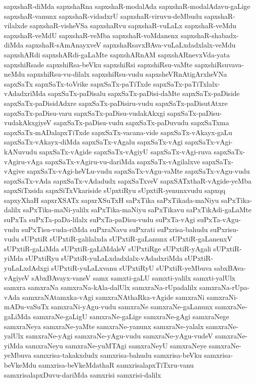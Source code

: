 {sapxshaR-diMda
sapxshaRna
sapxshaR-modalAda
sapxshaR-modalAdavu-gaLige
sapxshaR-vanunx
sapxshaR-vidadxrU
sapxshaR-viruvu-deMbudu
sapxshaR-vilalxde
sapxshaR-visheVSa
sapxshaRvu
sapxshaR-vuLaLx
sapxshaR-veMdu
sapxshaR-veMdU
sapxshaR-veMba
sapxshaR-voMdanenx
sapxshaR-shabadx-diMda
sapxshaR-sAmAnayxveV
sapxshaRsavxBAva-vuLaLxdadxlalx-veMdu
sapxshARdi
sapxshARdi-gaLaMte
sapxshARnAM
sapxshARnevxVda-yata
sapxshiRsade
sapxshiRsa-beVku
sapxshiRsi
sapxshiRsu-vaMte
sapxshiRsuvava-neMdu
sapxshiRsu-vu-dilalx
sapxshiRsu-vudu
sapxsheVRnAtigArxheVNa
sapxSaTx
sapxSaTx-toVrike
sapxSaTx-paTiTxde
sapxSaTx-paTiTxlalx-vAdadxriMda
sapxSaTx-paDisalu
sapxSaTx-paDisi-daMte
sapxSaTx-paDiside
sapxSaTx-paDisidAdxre
sapxSaTx-paDisiru-vudu
sapxSaTx-paDisutAtxre
sapxSaTx-paDisu-varu
sapxSaTx-paDisu-vudakAkxgi
sapxSaTx-paDisu-vudakAkxgiyeV
sapxSaTx-paDisu-vudu
sapxSaTx-paDuvudu
sapxSaTxma
sapxSaTx-mADalapxTiTxde
sapxSaTx-vacana-vide
sapxSaTx-vAkayx-gaLu
sapxSaTx-vAkayx-diMda
sapxSaTx-vAgalu
sapxSaTx-vAgi
sapxSaTx-vAgi-kANuvudu
sapxSaTx-vAgide
sapxSaTx-vAgiyU
sapxSaTx-vAgi-ruva
sapxSaTx-vAgiru-vAga
sapxSaTx-vAgiru-vu-dariMda
sapxSaTx-vAgilalxve
sapxSaTx-vAgive
sapxSaTx-vAgi-heVLu-vudu
sapxSaTx-vAgu-vaMte
sapxSaTx-vAgu-vudu
sapxSaTx-vAda
sapxSaTx-vAdadudx
sapxSaTxveV
sapxSATxthaR-vAgide-yeMba
sapxSiTxsida
sapxSiTxVkariside
sUpxtiRyu
sUpxtiR-yenunxvudu
sapxqq
sapxyXhaH
sapxrXSATx
sapxrXSuTxH
saPxTika
saPxTikada-maNiyu
saPxTika-dalilx
saPxTika-maNi-yalilx
saPxTika-maNiyu
saPxTikavu
saPxTikAdi-gaLaMte
suPxTa
suPxTa-paDa-lilalx
suPxTa-paDisu-vudu
suPxTa-vAgi
suPxTa-vAgu-vudu
suPxTisu-vuda-riMda
suPxraNavu
suPxrati
suPxrisa-bahudu
suPxrisu-vudu
sUPxtiR
sUPxtiR-galilalxda
sUPxtiR-gaLanunx
sUPxtiR-gaLanenxV
sUPxtiR-gaLiMda
sUPxtiR-gaLiMdaleV
sUPxtiRge
sUPxtiR-yAgali
sUPxtiR-yiMda
sUPxtiRyu
sUPxtiR-yuLaLxdadxlalx-vAdadxriMda
sUPxtiR-yuLaLxdAdxgi
sUPxtiR-yuLaLxvanu
sUPxtiRyU
sUPxtiR-yeMbuva
sabxBAva-vAgiyeV
sAbxBAvayx-vaneV
samx
samxti-gaLU
samxti-yalilx
samxti-yalUlx
samxra
samxraNa
samxraNa-kAla-dalUlx
samxraNa-rUpadalilx
samxraNa-rUpa-vAda
samxraNAtamxka-vAgi
samxraNAthaRka-vAgide
samxraNi
samxraNi-mADu-vaSuTx
samxraNi-yAgu-vudu
samxraNe
samxraNe-gaLanunx
samxraNe-gaLiMda
samxraNe-gaLigU
samxraNe-gaLige
samxraNe-gAgi
samxraNege
samxraNeya
samxraNe-yaMte
samxraNe-yanunx
samxraNe-yalalx
samxraNe-yalUlx
samxraNe-yAgi
samxraNe-yAgu-vudu
samxraNe-yAgu-vudeV
samxraNe-yiMda
samxraNeyu
samxraNe-yuMTAgi
samxraNeyU
samxraNeye
samxraNe-yeMbuva
samxrisa-takakxdudx
samxrisa-bahudu
samxrisa-beVku
samxrisa-beVkeMdu
samxrisa-beVkeMdathaR
samxrisalapxTiTxru-vanu
samxrisalapxDuvu-dariMda
samxrisi
samxrisi-dalilx
}
